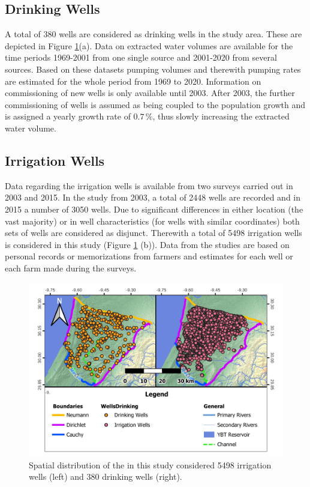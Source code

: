 \subsection{Drinking Wells}

A total of 380 wells are considered as drinking wells in the study area. These are depicted in Figure \ref{Map-PumpWells}(a). Data on extracted water volumes are available for the time periods 1969-2001 from one single source and 2001-2020 from several sources. Based on these datasets pumping volumes and therewith pumping rates are estimated for the whole period from 1969 to 2020. Information on commissioning of new wells is only available until 2003. After 2003, the further commissioning of wells is assumed as being coupled to the population growth and is assigned a yearly growth rate of $0.7 \, \%$, thus slowly increasing the extracted water volume.

\subsection{Irrigation Wells}

Data regarding the irrigation wells is available from two surveys carried out in 2003 and 2015. In the study from 2003, a total of 2448 wells are recorded and in 2015 a number of 3050 wells. Due to significant differences in either location (the vast majority) or in well characteristics (for wells with similar coordinates) both sets of wells are considered as disjunct. Therewith a total of 5498 irrigation wells is considered in this study (Figure \ref{Map-PumpWells} (b)). Data from the studies are based on personal records or memorizations from farmers and estimates for each well or each farm made during the surveys.

\begin{figure}[h]
    \centering
    \includegraphics{./img/Map_IrrDri.pdf}
    \caption{Spatial distribution of the in this study considered 5498 irrigation wells (left) and 380 drinking wells (right).}
    \label{Map-PumpWells}
\end{figure}

